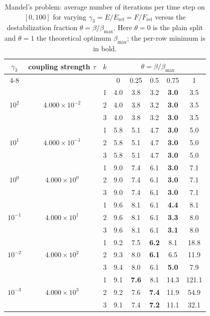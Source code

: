 \begin{table}[ht!]
\centering
\renewcommand{\arraystretch}{1.15}
\begin{tabular}{cccccccc}
\toprule
$\gamma_3$ & coupling strength $\tau$ & $k$ & \multicolumn{5}{c}{$\theta = \beta/\beta_{\max}$} \\
\cmidrule(lr){4-8}
& & & 0 & 0.25 & 0.5 & 0.75 & 1 \\
\midrule
\multirow{3}{*}{$10^{2}$} & \multirow{3}{*}{$4.000 \times 10^{-2}$} & 1 & 4.0 & 3.8 & 3.2 & \textbf{3.0} & 3.5 \\
&  & 2 & 4.0 & 3.8 & 3.2 & \textbf{3.0} & 3.5 \\
&  & 3 & 4.0 & 3.8 & 3.2 & \textbf{3.0} & 3.5 \\
\midrule
\multirow{3}{*}{$10^{1}$} & \multirow{3}{*}{$4.000 \times 10^{-1}$} & 1 & 5.8 & 5.1 & 4.7 & \textbf{3.0} & 5.0 \\
&  & 2 & 5.8 & 5.1 & 4.7 & \textbf{3.0} & 5.0 \\
&  & 3 & 5.8 & 5.1 & 4.7 & \textbf{3.0} & 5.0 \\
\midrule
\multirow{3}{*}{$10^{0}$} & \multirow{3}{*}{$4.000 \times 10^{0}$} & 1 & 9.0 & 7.4 & 6.1 & \textbf{3.0} & 7.1 \\
&  & 2 & 9.0 & 7.4 & 6.1 & \textbf{3.0} & 7.1 \\
&  & 3 & 9.0 & 7.4 & 6.1 & \textbf{3.0} & 7.1 \\
\midrule
\multirow{3}{*}{$10^{-1}$} & \multirow{3}{*}{$4.000 \times 10^{1}$} & 1 & 9.6 & 8.1 & 6.1 & \textbf{4.4} & 8.1 \\
&  & 2 & 9.6 & 8.1 & 6.1 & \textbf{3.3} & 8.0 \\
&  & 3 & 9.6 & 8.1 & 6.1 & \textbf{3.1} & 8.0 \\
\midrule
\multirow{3}{*}{$10^{-2}$} & \multirow{3}{*}{$4.000 \times 10^{2}$} & 1 & 9.2 & 7.5 & \textbf{6.2} & 8.1 & 18.8 \\
&  & 2 & 9.3 & 8.0 & \textbf{6.1} & 6.5 & 11.9 \\
&  & 3 & 9.4 & 8.0 & 6.1 & \textbf{5.0} & 7.9 \\
\midrule
\multirow{3}{*}{$10^{-3}$} & \multirow{3}{*}{$4.000 \times 10^{3}$} & 1 & 9.1 & \textbf{7.6} & 8.1 & 14.3 & 121.1 \\
&  & 2 & 9.2 & 7.6 & \textbf{7.4} & 11.9 & 54.9 \\
&  & 3 & 9.1 & 7.4 & \textbf{7.2} & 11.1 & 32.1 \\
\bottomrule
\end{tabular}
\caption{Mandel's problem: average number of iterations per time step on $[0, 100]$ for varying $\gamma_3 = E/E_{\mathrm{ref}} = F/F_{\mathrm{ref}}$ versus the destabilization fraction $\theta = \beta/\beta_{\max}$. Here $\theta = 0$ is the plain split and $\theta = 1$ the theoretical optimum $\beta_{\max}$; the per-row minimum is in bold.}
\label{tab:mandel_scaling_iterations}
\end{table}